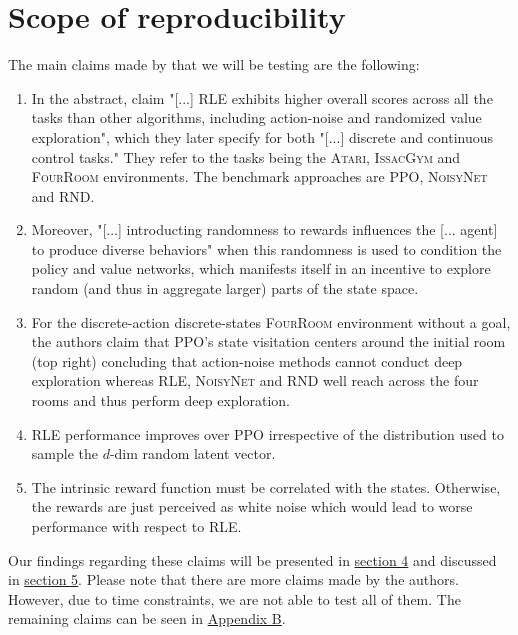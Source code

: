 \documentclass[10pt]{article} %
\begin{document}
\newpage
\section{Scope of reproducibility}
\label{sec:claims}

The main claims made by \cite{rle-paper} that we will be testing are the following:

\begin{enumerate}
    \item In the abstract, \cite{rle-paper} claim "[...] \textsc{RLE} exhibits higher overall scores across all the tasks than other algorithms, including action-noise and randomized value exploration", which they later specify for both "[...] discrete and continuous control tasks." They refer to the tasks being the \textsc{Atari}, \textsc{IssacGym} and \textsc{FourRoom} environments. The benchmark approaches are \textsc{PPO}, \textsc{NoisyNet} and \textsc{RND}.
    \item Moreover, "[...] introducting randomness to rewards influences the [... agent] to produce diverse behaviors" \citep{rle-paper} when this randomness is used to condition the policy and value networks, which manifests itself in an incentive to explore random (and thus in aggregate larger) parts of the state space.
    \item For the discrete-action discrete-states \textsc{FourRoom} environment without a goal, the authors claim that \textsc{PPO}'s state visitation centers around the initial room (top right) concluding that action-noise methods cannot conduct deep exploration whereas \textsc{RLE}, \textsc{NoisyNet} and \textsc{RND} well reach across the four rooms and thus perform deep exploration.
    \item \textsc{RLE} performance improves over \textsc{PPO} irrespective of the distribution used to sample the $d$-dim random latent vector.
    \item The intrinsic reward function must be correlated with the states. Otherwise, the rewards are just perceived as white noise which would lead to worse performance with respect to \textsc{RLE}. 
\end{enumerate}

\noindent Our findings regarding these claims will be presented in \hyperlink{sec4}{section 4} and discussed in \hyperlink{sec5}{section 5}. Please note that there are more claims made by the authors. However, due to time constraints, we are not able to test all of them. The remaining claims can be seen in \hyperlink{untested-claims}{Appendix B}.
\end{document}
